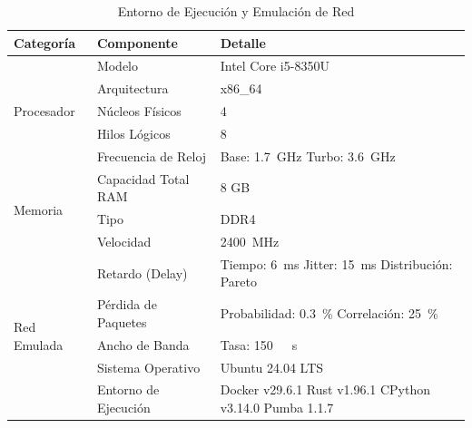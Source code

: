 \begin{table}[ht]
	\caption{Entorno de Ejecución y Emulación de Red}
	\label{tab:environment}
	\centering
	\footnotesize
	\begin{tabular}{llp{2.4cm}}
		\toprule
		\textbf{Categoría} & \textbf{Componente} & \textbf{Detalle} \\
		\midrule
		\multirow{5}{*}{Procesador} & Modelo & Intel Core i5-8350U \\
			& Arquitectura & x86\_64 \\
			& Núcleos Físicos & 4 \\
			& Hilos Lógicos & 8 \\
			& Frecuencia de Reloj & Base: \SI[round-precision=1]{1.7}{\giga\hertz} \newline Turbo: \SI[round-precision=1]{3.6}{\giga\hertz} \\
		\midrule
		\multirow{3}{*}{Memoria} & Capacidad Total RAM & 8 GB \\
			& Tipo & DDR4 \\
			& Velocidad & \SI[round-precision=0]{2400}{\mega\hertz} \\
		\midrule
		\multirow{6}{*}{Red Emulada} & Retardo (Delay) & Tiempo: \SI[round-precision=0]{6}{\milli\second} \newline Jitter: \SI[round-precision=0]{15}{\milli\second} \newline Distribución: Pareto \\
			& Pérdida de Paquetes & Probabilidad: \qty[round-precision=1]{0.3}{\percent} \newline Correlación: \qty[round-precision=0]{25}{\percent} \\
			& Ancho de Banda & Tasa: \SI[round-precision=0]{150}{\mega\bit\second} \\
		\midrule
		\multirow{5}{*}{Entorno de Software} & Sistema Operativo & Ubuntu 24.04 LTS \\
			& Entorno de Ejecución & Docker v29.6.1 \newline Rust v1.96.1 \newline CPython v3.14.0 \newline Pumba 1.1.7 \\
		\bottomrule
	\end{tabular}
\end{table}

\FloatBarrier
